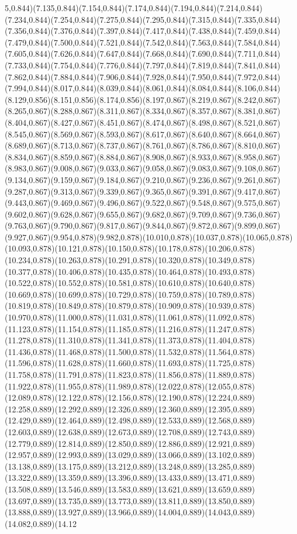 \documentclass[smallextended]{svjour3}
\begin{document}
5,0.844)(7.135,0.844)(7.154,0.844)(7.174,0.844)(7.194,0.844)(7.214,0.844)(7.234,0.844)(7.254,0.844)(7.275,0.844)(7.295,0.844)(7.315,0.844)(7.335,0.844)(7.356,0.844)(7.376,0.844)(7.397,0.844)(7.417,0.844)(7.438,0.844)(7.459,0.844)(7.479,0.844)(7.500,0.844)(7.521,0.844)(7.542,0.844)(7.563,0.844)(7.584,0.844)(7.605,0.844)(7.626,0.844)(7.647,0.844)(7.668,0.844)(7.690,0.844)(7.711,0.844)(7.733,0.844)(7.754,0.844)(7.776,0.844)(7.797,0.844)(7.819,0.844)(7.841,0.844)(7.862,0.844)(7.884,0.844)(7.906,0.844)(7.928,0.844)(7.950,0.844)(7.972,0.844)(7.994,0.844)(8.017,0.844)(8.039,0.844)(8.061,0.844)(8.084,0.844)(8.106,0.844)(8.129,0.856)(8.151,0.856)(8.174,0.856)(8.197,0.867)(8.219,0.867)(8.242,0.867)(8.265,0.867)(8.288,0.867)(8.311,0.867)(8.334,0.867)(8.357,0.867)(8.381,0.867)(8.404,0.867)(8.427,0.867)(8.451,0.867)(8.474,0.867)(8.498,0.867)(8.521,0.867)(8.545,0.867)(8.569,0.867)(8.593,0.867)(8.617,0.867)(8.640,0.867)(8.664,0.867)(8.689,0.867)(8.713,0.867)(8.737,0.867)(8.761,0.867)(8.786,0.867)(8.810,0.867)(8.834,0.867)(8.859,0.867)(8.884,0.867)(8.908,0.867)(8.933,0.867)(8.958,0.867)(8.983,0.867)(9.008,0.867)(9.033,0.867)(9.058,0.867)(9.083,0.867)(9.108,0.867)(9.134,0.867)(9.159,0.867)(9.184,0.867)(9.210,0.867)(9.236,0.867)(9.261,0.867)(9.287,0.867)(9.313,0.867)(9.339,0.867)(9.365,0.867)(9.391,0.867)(9.417,0.867)(9.443,0.867)(9.469,0.867)(9.496,0.867)(9.522,0.867)(9.548,0.867)(9.575,0.867)(9.602,0.867)(9.628,0.867)(9.655,0.867)(9.682,0.867)(9.709,0.867)(9.736,0.867)(9.763,0.867)(9.790,0.867)(9.817,0.867)(9.844,0.867)(9.872,0.867)(9.899,0.867)(9.927,0.867)(9.954,0.878)(9.982,0.878)(10.010,0.878)(10.037,0.878)(10.065,0.878)(10.093,0.878)(10.121,0.878)(10.150,0.878)(10.178,0.878)(10.206,0.878)(10.234,0.878)(10.263,0.878)(10.291,0.878)(10.320,0.878)(10.349,0.878)(10.377,0.878)(10.406,0.878)(10.435,0.878)(10.464,0.878)(10.493,0.878)(10.522,0.878)(10.552,0.878)(10.581,0.878)(10.610,0.878)(10.640,0.878)(10.669,0.878)(10.699,0.878)(10.729,0.878)(10.759,0.878)(10.789,0.878)(10.819,0.878)(10.849,0.878)(10.879,0.878)(10.909,0.878)(10.939,0.878)(10.970,0.878)(11.000,0.878)(11.031,0.878)(11.061,0.878)(11.092,0.878)(11.123,0.878)(11.154,0.878)(11.185,0.878)(11.216,0.878)(11.247,0.878)(11.278,0.878)(11.310,0.878)(11.341,0.878)(11.373,0.878)(11.404,0.878)(11.436,0.878)(11.468,0.878)(11.500,0.878)(11.532,0.878)(11.564,0.878)(11.596,0.878)(11.628,0.878)(11.660,0.878)(11.693,0.878)(11.725,0.878)(11.758,0.878)(11.791,0.878)(11.823,0.878)(11.856,0.878)(11.889,0.878)(11.922,0.878)(11.955,0.878)(11.989,0.878)(12.022,0.878)(12.055,0.878)(12.089,0.878)(12.122,0.878)(12.156,0.878)(12.190,0.878)(12.224,0.889)(12.258,0.889)(12.292,0.889)(12.326,0.889)(12.360,0.889)(12.395,0.889)(12.429,0.889)(12.464,0.889)(12.498,0.889)(12.533,0.889)(12.568,0.889)(12.603,0.889)(12.638,0.889)(12.673,0.889)(12.708,0.889)(12.743,0.889)(12.779,0.889)(12.814,0.889)(12.850,0.889)(12.886,0.889)(12.921,0.889)(12.957,0.889)(12.993,0.889)(13.029,0.889)(13.066,0.889)(13.102,0.889)(13.138,0.889)(13.175,0.889)(13.212,0.889)(13.248,0.889)(13.285,0.889)(13.322,0.889)(13.359,0.889)(13.396,0.889)(13.433,0.889)(13.471,0.889)(13.508,0.889)(13.546,0.889)(13.583,0.889)(13.621,0.889)(13.659,0.889)(13.697,0.889)(13.735,0.889)(13.773,0.889)(13.811,0.889)(13.850,0.889)(13.888,0.889)(13.927,0.889)(13.966,0.889)(14.004,0.889)(14.043,0.889)(14.082,0.889)(14.12
\end{document}
